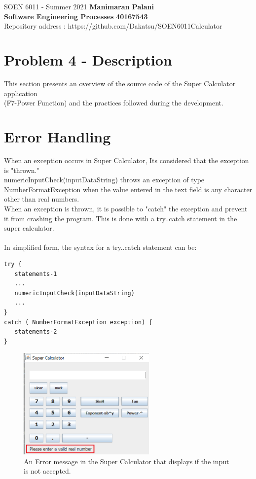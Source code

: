 \documentclass[letterpaper, 11pt]{report}
\begin{document}
 
 
\pagebreak

\section*{}
\normalsize {SOEN 6011 - Summer 2021} \hfill \textbf{Manimaran Palani} \\
\textbf{ Software Engineering Processes}  \hfill \textbf{40167543} \\
\hfill Repository address : https://github.com/Dakatsu/SOEN6011Calculator
\\
\section*{\textbf{Problem 4 - Description}}
This section presents an overview of the source code of the Super Calculator application \\(F7-Power Function)  and the
practices followed during the development.
\vspace{0.4cm}
\section*{Error Handling}
When an exception occurs in Super Calculator, Its considered that the exception is "thrown."
\newline\\
numericInputCheck(inputDataString)  throws an exception of type NumberFormatException when the value entered in the text field is any character other than real numbers. \newline\\
When an exception is thrown, it is possible to "catch" the exception and prevent it from crashing the program. This is done with a try..catch statement in the super calculator. 
\newline\\\\
In simplified form, the syntax for a try..catch statement can be:
\\
\begin{lstlisting}
try {
   statements-1
   ...
   numericInputCheck(inputDataString)
   ...
}
catch ( NumberFormatException exception) {
   statements-2
}
\end{lstlisting}
\begin{figure}
\includegraphics[width=0.6\textwidth]{error_handling_F7}
\centering
\caption{ An Error message in the Super Calculator that displays if the input is not accepted.
}
\end{figure}
\newpage
\end{document}

